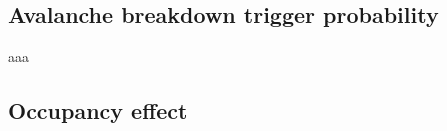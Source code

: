 \subsection*{Avalanche breakdown trigger probability}
aaa

\subsection{Occupancy effect}\label{subsec:occupancy_teo}

